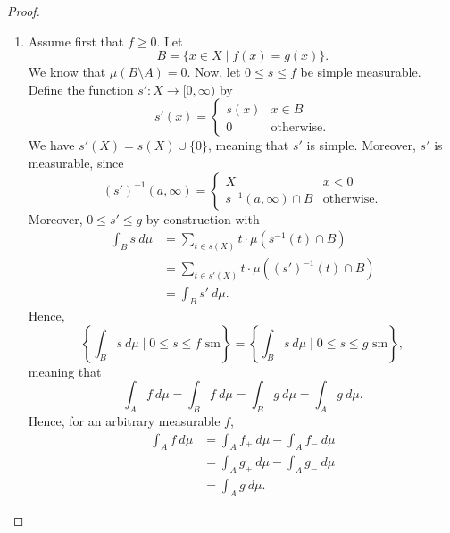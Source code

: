 \documentclass[a4paper, openany]{memoir}
\theoremstyle{definition}
\theoremstyle{plain}
\begin{document}
\begin{proof}
\begin{enumerate}
\begin{enumerate}
                \item Assume first that $f \geq 0$. Let
                \[B = \{x \in X \mid f(x) = g(x)\}.\]
                We know that $\mu(B \setminus A) = 0$. Now, let $0 \leq s \leq f$ be simple measurable. Define the function $s' \colon X \to [0, \infty)$ by
                \[s'(x) = \begin{cases}
                    s(x) & x \in B \\
                    0 & \textrm{otherwise}.
                \end{cases}\]
                We have $s'(X) = s(X) \cup \{0\}$, meaning that $s'$ is simple. Moreover, $s'$ is measurable, since 
                \[(s')^{-1}(a, \infty) = \begin{cases}
                    X & x < 0 \\
                    s^{-1}(a, \infty) \cap B & \textrm{otherwise}.
                \end{cases}\]
                Moreover, $0 \leq s' \leq g$ by construction with
                \begin{align*}
                    \int_B s \ d\mu &= \sum_{t \in s(X)} t \cdot \mu(s^{-1}(t) \cap B) \\
                    &= \sum_{t \in s'(X)} t \cdot \mu((s')^{-1}(t) \cap B) \\
                    &= \int_B s' \ d\mu.
                \end{align*}
                Hence,
                \[\left\{\int_B s \ d\mu \mid 0 \leq s \leq f \textrm{ sm}\right\} = \left\{\int_B s \ d\mu \mid 0 \leq s \leq g \textrm{ sm}\right\},\]
                meaning that
                \[\int_A f \ d\mu = \int_B f \ d\mu = \int_B g \ d\mu = \int_A g \ d\mu.\]
                Hence, for an arbitrary measurable $f$,
                \begin{align*}
                    \int_A f \ d\mu &= \int_A f_+ \ d\mu - \int_A f_- \ d\mu \\
                    &= \int_A g_+ \ d\mu - \int_A g_- \ d\mu \\
                    &= \int_A g \ d\mu.
                \end{align*}
            \end{enumerate}
        \end{enumerate}
    \end{proof}
    \newpage
\end{document}

